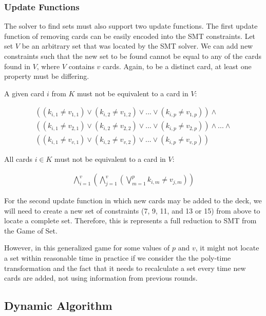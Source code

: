 \documentclass[pageno]{jpaper}
\begin{document}
\subsubsection{Update Functions} 
The solver to find sets must also support two update functions. The first update function of removing cards can be easily encoded into the SMT constraints. Let set $V$ be an arbitrary set that was located by the SMT solver. We can add new constraints such that the new set to be found cannot be equal to any of the cards found in $V$, where $V$ contains $v$ cards. Again, to be a distinct card, at least one property must be differing. 

A given card $i$ from $K$ must not be equivalent to a card in $V$:

\begin{multline}
	((k_{i,1} \neq v_{1,1}) \vee (k_{i,2} \neq v_{1,2}) \vee ... \vee (k_{i,p} \neq v_{1,p})) \wedge \\
	 ((k_{i,1} \neq v_{2,1}) \vee (k_{i,2} \neq v_{2,2}) \vee ... \vee (k_{i,p} \neq v_{2,p}))  \wedge ... \wedge \\ ((k_{i,1} \neq v_{v,1}) \vee (k_{i,2} \neq v_{v,2}) \vee ... \vee (k_{i,p} \neq v_{v,p})) 
\end{multline}

All cards $i \in K$ must not be equivalent to a card in $V$:

\begin{align}
	\bigwedge \limits_{i=1}^{v}   \left( \bigwedge \limits_{j=1}^{v}  \left( \bigvee \limits_{m = 1}^{p} k_{i,m} \neq v_{j,m} \right)   \right)
\end{align}




For the second update function in which new cards may be added to the deck, we will need to create a new set of constraints (7, 9, 11, and 13 or 15) from above to locate a complete set. Therefore, this is represents a full reduction to SMT from the Game of Set. 

However, in this generalized game for some values of $p$ and $v$, it might not locate a set within reasonable time in practice if we consider the the poly-time transformation and the fact that it needs to recalculate a set every time new cards are added, not using information from previous rounds.

\subsection{Dynamic Algorithm}
\end{document}
